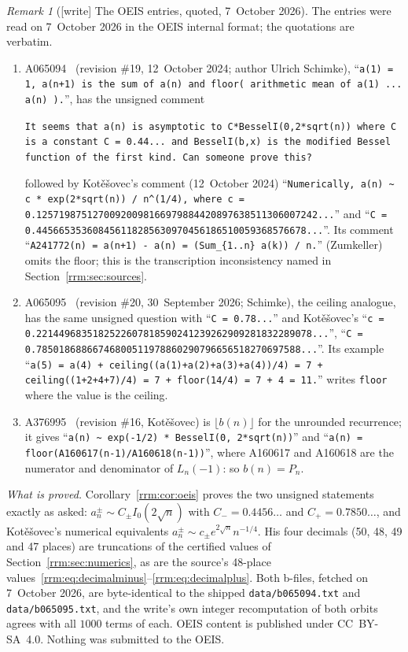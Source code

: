 \documentclass[11pt]{article}
\theoremstyle{remark}\newtheorem{remark}[theorem]{Remark}
\newcommand{\file}[1]{\nolinkurl{#1}}
\begin{document}
\begin{remark}[{[write]} The OEIS entries, quoted, 7~October 2026]\label{rrm:rem:oeis}
The entries were read on 7~October 2026 in the OEIS internal format; the
quotations are verbatim.
\begin{enumerate}[label=(\alph*)]\raggedright
\item A065094~\cite{oeisfloor} (revision \#19, 12~October 2024; author Ulrich
 Schimke), ``\texttt{a(1) = 1, a(n+1) is the sum of a(n) and floor( arithmetic
 mean of a(1) ... a(n) ).}'', has the unsigned comment
 \begin{center}\small
 \parbox{0.92\textwidth}{\raggedright\texttt{It seems that a(n) is asymptotic to C*BesselI(0,2*sqrt(n)) where C is a constant C = 0.44... and BesselI(b,x) is the modified Bessel function of the first kind. Can someone prove this?}}
 \end{center}
 followed by Kot\v{e}\v{s}ovec's comment (12~October 2024) ``\texttt{Numerically,
 a(n) \textasciitilde{} c * exp(2*sqrt(n)) / n\^{}(1/4), where c =
 0.12571987512700920098166979884420897638511306007242...}'' and ``\texttt{C =
 0.445665353608456118285630970456186510059368576678...}''. Its comment
 ``\texttt{A241772(n) = a(n+1) - a(n) = (Sum\_\{1..n\} a(k)) / n.}''
 (Zumkeller) omits the floor; this is the transcription inconsistency named in
 Section~\ref{rrm:sec:sources}.
\item A065095~\cite{oeisceil} (revision \#20, 30~September 2026; Schimke),
 the ceiling analogue, has the same unsigned question with ``\texttt{C =
 0.78...}'' and Kot\v{e}\v{s}ovec's ``\texttt{c =
 0.2214496835182522607818590241239262909281832289078...}'', ``\texttt{C =
 0.78501868866746800511978860290796656518270697588...}''. Its example
 ``\texttt{a(5) = a(4) + ceiling((a(1)+a(2)+a(3)+a(4))/4) = 7 + ceiling((1+2+4+7)/4) = 7 + floor(14/4) = 7 + 4 = 11.}''
 writes \texttt{floor} where the value is the ceiling.
\item A376995~\cite{oeisunrounded} (revision \#16, Kot\v{e}\v{s}ovec) is
 $\lfloor b(n)\rfloor$ for the unrounded recurrence; it gives
 ``\texttt{a(n) \textasciitilde{} exp(-1/2) * BesselI(0, 2*sqrt(n))}'' and
 ``\texttt{a(n) = floor(A160617(n-1)/A160618(n-1))}'', where A160617 and
 A160618 are the numerator and denominator of $L_n(-1)$: so $b(n)=P_n$.
\end{enumerate}
\emph{What is proved.} Corollary~\ref{rrm:cor:oeis} proves the two unsigned
statements exactly as asked: $a_n^\pm\sim C_\pm I_0(2\sqrt n)$ with
$C_-=0.4456\ldots$ and $C_+=0.7850\ldots$, and Kot\v{e}\v{s}ovec's numerical
equivalents $a_n^\pm\sim c_\pm e^{2\sqrt n}n^{-1/4}$. His four decimals (50,
48, 49 and 47 places) are truncations of the certified values of
Section~\ref{rrm:sec:numerics}, as are the source's 48-place
values~\eqref{rrm:eq:decimalminus}--\eqref{rrm:eq:decimalplus}. Both b-files,
fetched on 7~October 2026, are byte-identical to the shipped
\file{data/b065094.txt} and \file{data/b065095.txt}, and the write's own
integer recomputation of both orbits agrees with all $1000$ terms of each.
OEIS content is published under CC~BY-SA~4.0. Nothing was submitted to the
OEIS.
\end{remark}
\end{document}
